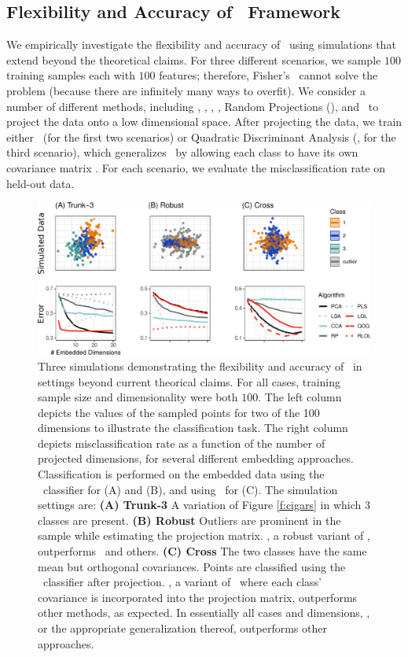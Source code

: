 \documentclass[11pt]{extarticle}
\begin{document}
\subsection*{Flexibility and Accuracy of \Lol~Framework}

We empirically investigate the flexibility and accuracy of \Lol~using simulations that extend beyond the theoretical claims.
For three different scenarios, we sample
$100$ training samples each with  $100$ features; therefore, Fisher's \Lda~cannot solve the problem (because there are infinitely many ways to overfit).
We consider a number of different methods, including 
\Pca, \Lda, \Pls, \Road, Random Projections (\Rp), and \Cca~to project the data onto a low dimensional space.
After projecting the data, we train either \Lda~(for the first two scenarios) or  Quadratic Discriminant Analysis (\Qda, for the third scenario), which generalizes \Lda~by allowing each class to have its own covariance matrix  \cite{Hastie2004}.
For each scenario, we evaluate the misclassification rate on held-out data.

\begin{figure}[h!]
\centering
\includegraphics[width=1\linewidth]{plot_sims}
\caption{
Three simulations demonstrating the flexibility and accuracy of \Lol~in settings beyond  current theorical claims.
For all cases, training sample size and dimensionality were both $100$. The left column depicts the values of the sampled points for two of the 100 dimensions to illustrate the classification task. The right column depicts misclassification rate as a function of the number of projected dimensions, for several different embedding approaches. 
Classification is performed on the embedded data using the \Lda~classifier for (A) and (B), and using \Qda~for (C).
The simulation settings are:
\textbf{(A) Trunk-3} A variation of Figure {\ref{f:cigars}\color{magenta}{(B)}} in which 3 classes are present.
\textbf{(B) Robust} Outliers  are prominent in the sample while estimating the projection matrix. \Rlol, a robust variant of \Lol, outperforms \Lol~and others.
\textbf{(C) Cross} The two classes have the same mean but orthogonal covariances. Points are classified using the \Qda~classifier after projection. \Qoq, a variant of \Lol~where each class' covariance is incorporated into the projection matrix, outperforms other methods, as expected.
In essentially all  cases and dimensions, \Lol, or the appropriate generalization thereof, outperforms other approaches.
}
\label{f:properties}
\end{figure}
\end{document}
